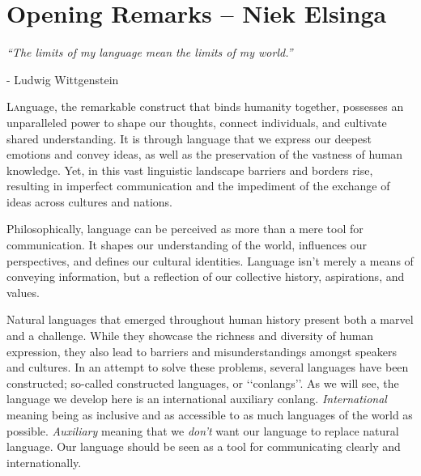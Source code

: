 
\setcounter{subsection}{-1}

\section{Opening Remarks -- {\small Niek Elsinga}}

\textit{“The limits of my language mean the limits of my world.”} 

- Ludwig Wittgenstein 

\vspace{0.7cm}
 

\noindent \lettrine{L}anguage, the remarkable construct that binds humanity together, possesses an unparalleled power to shape our thoughts, connect individuals, and cultivate shared understanding. It is through language that we express our deepest emotions and convey ideas, as well as the preservation of the vastness of human knowledge. Yet, in this vast linguistic landscape barriers and borders rise, resulting in imperfect communication and the impediment of the exchange of ideas across cultures and nations. 

Philosophically, language can be perceived as more than a mere tool for communication. It shapes our understanding of the world, influences our perspectives, and defines our cultural identities. Language isn't merely a means of conveying information, but a reflection of our collective history, aspirations, and values. 

Natural languages that emerged throughout human history present both a marvel and a challenge. While they showcase the richness and diversity of human expression, they also lead to barriers and misunderstandings amongst speakers and cultures. In an attempt to solve these problems, several languages have been constructed; so-called constructed languages, or \lq\lq conlangs\rq\rq. As we will see, the language we develop here is an international auxiliary conlang. {\it International} meaning being as inclusive and as accessible to as much languages of the world as possible. {\it Auxiliary} meaning that we {\it don't} want our language to replace natural language. Our language should be seen as a tool for communicating clearly and internationally. 


